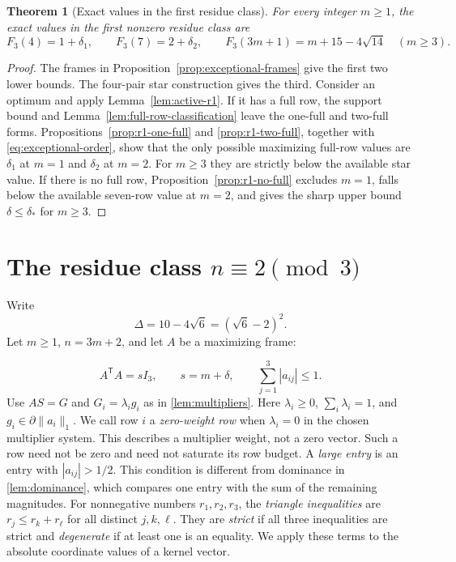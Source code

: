 \documentclass[11pt]{article}
\numberwithin{equation}{section}
\newtheorem{theorem}{Theorem}[section]
\theoremstyle{definition}
\theoremstyle{definition}
\begin{document}
\begin{theorem}[Exact values in the first residue class]
\label{thm:r1}
For every integer $m\ge1$, the exact values in the first nonzero
residue class are
\[
 F_3(4)=1+\delta_1,\qquad F_3(7)=2+\delta_2,
 \qquad F_3(3m+1)=m+15-4\sqrt{14}\quad(m\ge3).
\]
\end{theorem}
\begin{proof}
The frames in Proposition~\ref{prop:exceptional-frames} give the first
two lower bounds.  The four-pair star construction gives the third.
Consider an optimum and apply Lemma~\ref{lem:active-r1}.
If it has a full row, the support bound and
Lemma~\ref{lem:full-row-classification} leave the one-full and two-full
forms.  Propositions~\ref{prop:r1-one-full} and
\ref{prop:r1-two-full}, together with
\eqref{eq:exceptional-order}, show that the only possible maximizing
full-row values are $\delta_1$ at $m=1$ and $\delta_2$ at $m=2$.
For $m\ge3$ they are strictly below the available star value.
If there is no full row, Proposition~\ref{prop:r1-no-full} excludes
$m=1$, falls below the available seven-row value at $m=2$, and gives
the sharp upper bound $\delta\le\delta_*$ for $m\ge3$.
\end{proof}

\section{The residue class \texorpdfstring{$n\equiv2\pmod3$}{n = 2 mod 3}}
\label{sec:residue-two}

Write
\[
 \Delta=10-4\sqrt6=(\sqrt6-2)^2.
\]
Let $m\ge1$, $n=3m+2$, and let $A$ be a maximizing frame:

\[
 A^{\mathsf T}A=sI_3,\qquad s=m+\delta,\qquad
 \sum_{j=1}^3|a_{ij}|\le1.
\]
Use $AS=G$ and $G_i=\lambda_i g_i$ as in \cref{lem:multipliers}.
Here $\lambda_i\ge0$, $\sum_i\lambda_i=1$, and
$g_i\in\partial\|a_i\|_1$.  We call row $i$ a
\emph{zero-weight row} when $\lambda_i=0$ in the chosen multiplier
system. This describes a multiplier weight, not a zero vector.
Such a row need not be zero and need not saturate its row budget. A \emph{large entry} is an entry with $|a_{ij}|>1/2$.
This condition is different from dominance in \cref{lem:dominance},
which compares one entry with the sum of the remaining magnitudes.
For nonnegative numbers $r_1,r_2,r_3$, the \emph{triangle inequalities}
are $r_j\le r_k+r_\ell$ for all distinct $j,k,\ell$.
They are \emph{strict} if all three inequalities are strict and
\emph{degenerate} if at least one is an equality. We apply these
terms to the absolute coordinate values of a kernel vector.
\end{document}
